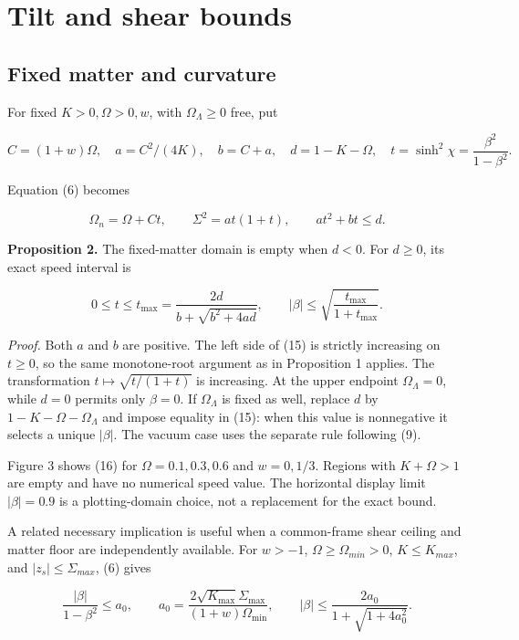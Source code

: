\documentclass[aps,prd,reprint,onecolumn,nofootinbib]{revtex4-2}
\begin{document}
\hypertarget{tilt-and-shear-bounds}{%
\section{Tilt and shear bounds}\label{tilt-and-shear-bounds}}

\hypertarget{fixed-matter-and-curvature}{%
\subsection{Fixed matter and curvature}\label{fixed-matter-and-curvature}}

For fixed \(K>0,\Omega>0,w\), with \(\Omega_\Lambda\ge 0\) free, put

\[
 C=(1+w)\Omega,\quad a=C^2/(4K),\quad b=C+a,\quad
 d=1-K-\Omega,\quad t=\sinh^2\chi=\frac{\beta^2}{1-\beta^2}.
 \tag{14}
\]

Equation (6) becomes

\[
 \Omega_n=\Omega+Ct,\qquad \Sigma^2=at(1+t),\qquad
 at^2+bt\le d.
 \tag{15}
\]

\textbf{Proposition 2.} The fixed-matter domain is empty when \(d<0\). For \(d\ge 0\), its exact speed interval is

\[
 0\le t\le t_{\max}=\frac{2d}{b+\sqrt{b^2+4ad}},
 \qquad
 |\beta|\le\sqrt{\frac{t_{\max}}{1+t_{\max}}}.
 \tag{16}
\]

\emph{Proof.} Both \(a\) and \(b\) are positive. The left side of (15) is strictly increasing on \(t\ge 0\), so the same monotone-root argument as in Proposition 1 applies. The transformation \(t\mapsto\sqrt{t/(1+t)}\) is increasing. At the upper endpoint \(\Omega_\Lambda=0\), while \(d=0\) permits only \(\beta=0\). If \(\Omega_\Lambda\) is fixed as well, replace \(d\) by \(1-K-\Omega-\Omega_\Lambda\) and impose equality in (15): when this value is nonnegative it selects a unique \(|\beta|\). The vacuum case uses the separate rule following (9).

Figure 3 shows (16) for \(\Omega=0.1,0.3,0.6\) and \(w=0,1/3\). Regions with \(K+\Omega>1\) are empty and have no numerical speed value. The horizontal display limit \(|\beta|=0.9\) is a plotting-domain choice, not a replacement for the exact bound.

A related necessary implication is useful when a common-frame shear ceiling and matter floor are independently available. For \(w>-1\), \(\Omega\ge \Omega_{min}>0\), \(K\le K_{max}\), and \(|z_s|\le \Sigma_{max}\), (6) gives

\[
 \frac{|\beta|}{1-\beta^2}\le a_0,
 \qquad a_0=\frac{2\sqrt{K_{\max}}\Sigma_{\max}}
                         {(1+w)\Omega_{\min}},
 \qquad
 |\beta|\le\frac{2a_0}{1+\sqrt{1+4a_0^2}}.
 \tag{17}
\]
\end{document}
